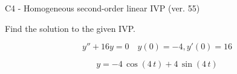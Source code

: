 \begin{exercise}
  \begin{exerciseTitle}C4 - Homogeneous second-order linear IVP (ver. 55)\end{exerciseTitle}
  \begin{exerciseStatement}
    
Find the solution to the given IVP.

    
\[y''+16y = 0 \hspace{1em} y(0) = -4 , y'(0) = 16\]

  \end{exerciseStatement}
  \begin{exerciseAnswer}
    
\[y= -4 \, \cos\left(4 \, t\right) + 4 \, \sin\left(4 \, t\right)\]

  \end{exerciseAnswer}
\end{exercise}